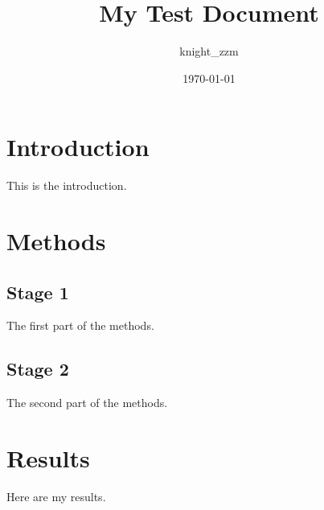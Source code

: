 \documentclass[a4paper,12pt]{report}
\begin{document}
\title{My Test Document}
\author{knight_zzm}
\date{\today}
\maketitle

\section{Introduction}
This is the introduction.

\section{Methods}

\subsection{Stage 1}
The first part of the methods.

\subsection{Stage 2}
The second part of the methods.

\section{Results}
Here are my results.
\end{document}
